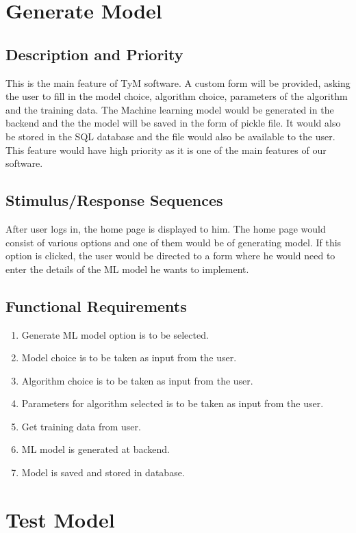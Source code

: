 \documentclass[12pt]{scrreprt}
\begin{document}
\section{Generate Model}

\subsection{Description and Priority}
This is the main feature of TyM software. A custom form will be provided, asking the user to fill in the model choice, algorithm choice, parameters of the algorithm and the training data. The Machine learning model would be generated in the backend and the the model will be saved in the form of pickle file. It would also be stored in the SQL database and the file would also be available to the user. This feature would have high priority as it is one of the main features of our software.

\subsection{Stimulus/Response Sequences}
After user logs in, the home page is displayed to him. The home page would consist of various options and one of them would be of generating model. If this option is clicked, the user would be directed to a form where he would need to enter the details of the ML model he wants to implement.  

\subsection{Functional Requirements}
\begin{enumerate}
\item Generate ML model option is to be selected.
\item Model choice is to be taken as input from the user.
\item Algorithm choice is to be taken as input from the user.
\item Parameters for algorithm selected is to be taken as input from the user.
\item Get training data from user.
\item ML model is generated at backend.
\item Model is saved and stored in database.
\end{enumerate}

\section{Test Model}
\end{document}
